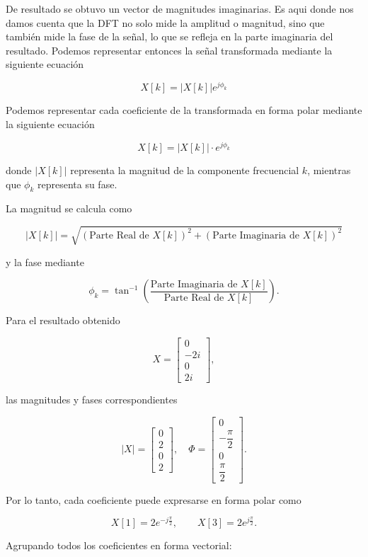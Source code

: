 \documentclass[12pt]{article}
\begin{document}
De resultado se obtuvo un vector de magnitudes imaginarias. Es aqui donde nos damos cuenta que la DFT no solo mide la amplitud o magnitud, sino que también mide la fase de la señal, lo que se refleja en la parte imaginaria del resultado.
Podemos representar entonces la señal transformada mediante la siguiente ecuación

$$
X[k] = |X[k]| e^{j \phi_k}
$$



Podemos representar cada coeficiente de la transformada en forma polar mediante la siguiente ecuación

$$
X[k] = |X[k]|  \cdot e^{j \phi_k}
$$

donde \( |X[k]| \) representa la magnitud de la componente frecuencial \(k\), mientras que \( \phi_k \) representa su fase.

La magnitud se calcula como

$$
|X[k]| =
\sqrt{
(\text{Parte Real de } X[k])^2 +
(\text{Parte Imaginaria de } X[k])^2
}
$$

y la fase mediante

$$
\phi_k =
\tan^{-1}
\left(
\frac{\text{Parte Imaginaria de } X[k]}
{\text{Parte Real de } X[k]}
\right).
$$

Para el resultado obtenido

$$
X =
\begin{bmatrix}
0\\
-2i\\
0\\
2i
\end{bmatrix},
$$

las magnitudes y fases correspondientes

$$
|X| =
\begin{bmatrix}
0\\
2\\
0\\
2
\end{bmatrix},
\quad 
\Phi =
\begin{bmatrix}
0\\
-\dfrac{\pi}{2}\\
0\\
\dfrac{\pi}{2}
\end{bmatrix}.
$$

Por lo tanto, cada coeficiente puede expresarse en forma polar como

$$
X[1] = 2e^{-j\frac{\pi}{2}},
\qquad
X[3] = 2e^{j\frac{\pi}{2}}.
$$

Agrupando todos los coeficientes en forma vectorial:
\end{document}
